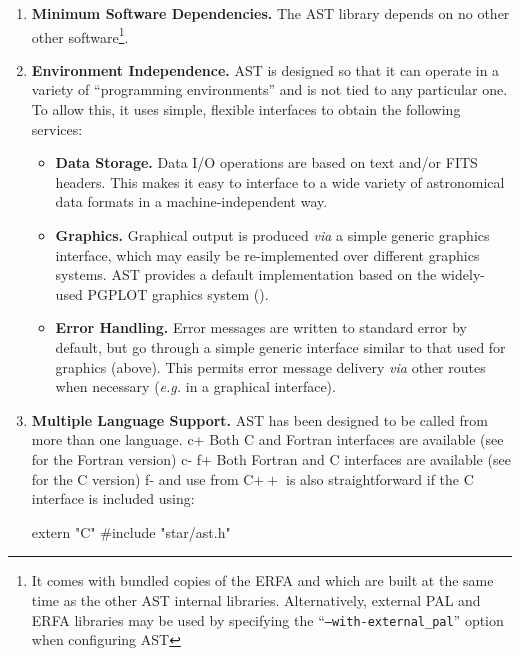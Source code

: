 \documentclass[twoside,11pt]{starlink}
\begin{document}
\begin{enumerate}
\item {\bf{Minimum Software Dependencies.}}
The AST library depends on no other other software\footnote{It comes with
bundled copies of the ERFA and
 which are built
at the same time as the other AST internal libraries. Alternatively, external
PAL and ERFA libraries may be used by specifying the ``\texttt{--with-external\_pal}'' option when configuring AST}.

\item {\bf{Environment Independence.}}
AST is designed so that it can operate in a variety of ``programming
environments'' and is not tied to any particular one. To allow this,
it uses simple, flexible interfaces to obtain the following services:

\begin{itemize}
\item {\bf{Data Storage.}} Data I/O operations are based on text
and/or FITS headers. This makes it easy to interface to a wide variety
of astronomical data formats in a machine-independent way.

\item {\bf{Graphics.}} Graphical output is produced \emph{via} a
simple generic graphics interface, which may easily be re-implemented
over different graphics systems. AST provides a default implementation
based on the widely-used PGPLOT graphics system
().

\item {\bf{Error Handling.}} Error messages are written to standard
error by default, but go through a simple generic interface similar to
that used for graphics (above). This permits error message delivery
\emph{via} other routes when necessary (\emph{e.g.} in a graphical
interface).
\end{itemize}

\item {\bf{Multiple Language Support.}}
AST has been designed to be called from more than one language.
c+
Both C and Fortran interfaces are available (see
 for the Fortran version)
c-
f+
Both Fortran and C interfaces are available (see
 for the C version)
f-
and use from C$++$ is also straightforward if the C interface is
included using:

\begin{small}
\begin{terminalv}
extern "C" {
#include "star/ast.h"
}
\end{terminalv}
\end{small}


\end{enumerate}
\end{document}
